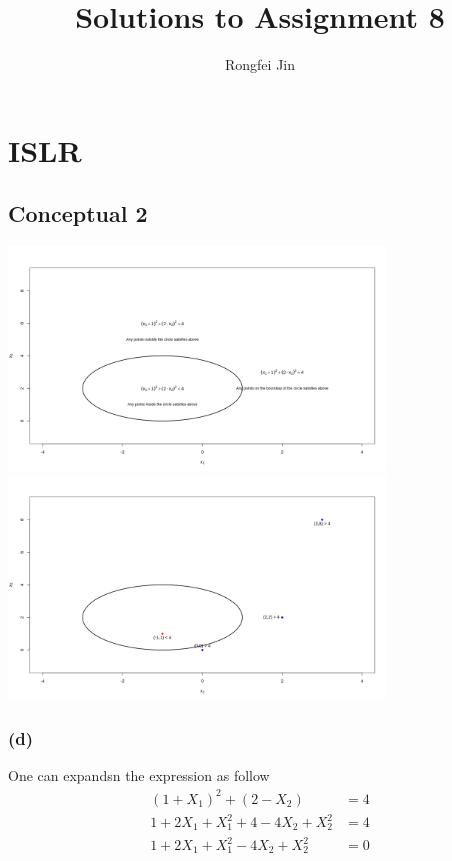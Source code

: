 \documentclass{article}
\title{Solutions to Assignment 8}
\author{Rongfei Jin}
\begin{document}
\pagestyle{fancy}
\fancyhf{}%
\fancyfoot[C]{\thepage}%
\maketitle


\section{ISLR}
\subsection{Conceptual 2}
\includegraphics[width=0.75\textwidth]{figs/q2-1.png}
\newline
\includegraphics[width=0.75\textwidth]{figs/q2-2.png}

\subsubsection{(d)}
One can expandsn the expression as follow
\begin{align*}
(1+X_1)^2 + (2-X_2) &= 4 \\
1 + 2X_1 + X_1^2 + 4 - 4X_2 + X_2^2 &= 4 \\
1 + 2X_1 + X_1^2 - 4X_2 + X_2^2 &= 0 \\
\end{align*}
\end{document}
